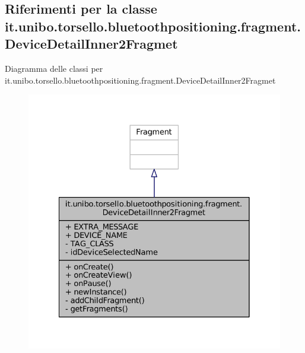 \hypertarget{classit_1_1unibo_1_1torsello_1_1bluetoothpositioning_1_1fragment_1_1DeviceDetailInner2Fragmet}{}\subsection{Riferimenti per la classe it.\+unibo.\+torsello.\+bluetoothpositioning.\+fragment.\+Device\+Detail\+Inner2\+Fragmet}
\label{classit_1_1unibo_1_1torsello_1_1bluetoothpositioning_1_1fragment_1_1DeviceDetailInner2Fragmet}


Diagramma delle classi per it.\+unibo.\+torsello.\+bluetoothpositioning.\+fragment.\+Device\+Detail\+Inner2\+Fragmet
\nopagebreak
\begin{figure}[H]
\begin{center}
\leavevmode
\includegraphics[width=328pt]{classit_1_1unibo_1_1torsello_1_1bluetoothpositioning_1_1fragment_1_1DeviceDetailInner2Fragmet__inherit__graph}
\end{center}
\end{figure}


